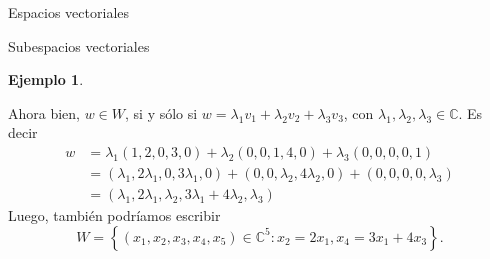 \documentclass[a4paper,12pt,twoside,spanish,reqno]{amsbook}
\theoremstyle{definition}
\newtheorem{ejemplo}{Ejemplo}[section]
\theoremstyle{remark}
\newcommand{\C}{\mathbb C}
\begin{document}
\begin{chapter}{Espacios vectoriales}
\begin{section}{Subespacios vectoriales}
\begin{ejemplo}
\begin{enumerate}
            Ahora bien, $w \in W$, si y sólo si $w = \lambda_1 v_1+\lambda_2 v_2+\lambda_3 v_3$, con $\lambda_1,\lambda_2,\lambda_3 \in \C$. Es decir
            \begin{align*}
                w &= \lambda_1 (1,2,0,3,0)+\lambda_2 (0,0,1,4,0)+\lambda_3 (0,0,0,0,1) \\
                &=  (\lambda_1,2\lambda_1,0,3\lambda_1,0)+ (0,0,\lambda_2,4\lambda_2,0)+ (0,0,0,0,\lambda_3) \\ &=(\lambda_1,2\lambda_1,\lambda_2,3\lambda_1+4\lambda_2,\lambda_3)
            \end{align*} 
            Luego,  también podríamos escribir
            \begin{equation*}
                W = \left\{(x_1,x_2,x_3,x_4,x_5)\in \C^5: x_2 = 2x_1, x_4 = 3x_1+4x_3 \right\}.
            \end{equation*}
            

\end{enumerate}
\end{ejemplo}
\end{section}
\end{chapter}
\end{document}
